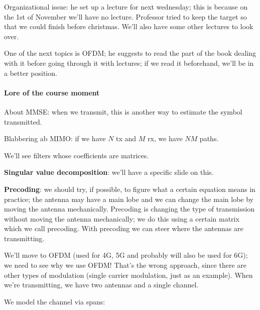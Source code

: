 \documentclass[a4paper, 12pt]{book}
\begin{document}
Organizational issue: he set up a lecture for next wednesday; this is because on the 1st of November we'll have no lecture.
Professor tried to keep the target so that we could finish before christmas.
We'll also have some other lectures to look over.

One of the next topics is OFDM; he suggests to read the part of the book dealing with it before going through it with lectures; if we read it beforehand, we'll be in a better position.

\paragraph{Lore of the course moment}
About MMSE: when we transmit, this is another way to estimate the symbol transmitted.

Blabbering ab MIMO: if we have $N$ tx and $M$ rx, we have $NM$ paths.

We'll see filters whose coefficients are matrices.

\textbf{Singular value decomposition}: we'll have a specific slide on this.

\textbf{Precoding}: we should try, if possible, to figure what a certain equation means in practice; the antenna may have a main lobe and we can change the main lobe by moving the antenna mechanically.
Precoding is changing the type of transmission without moving the antenna mechanically; we do this using a certain matrix which we call precoding.
With precoding we can steer where the antennas are transmitting.

We'll move to OFDM (used for 4G, 5G and probably will also be used for 6G); we need to see why we use OFDM! That's the wrong approach, since there are other types of modulation (single carrier modulation, just as an example).
When we're transmitting, we have two antennas and a single channel.

We model the channel via spans:

\end{document}

